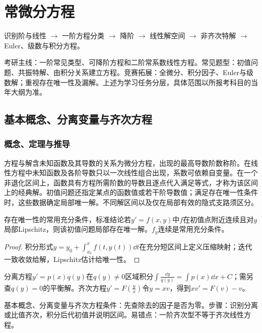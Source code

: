 \chapter{常微分方程}\label{ch:4}
\begin{tcolorbox}[title=章首知识地图,colframe=Ink]
识别阶与线性 $\to$ 一阶方程分类 $\to$ 降阶 $\to$ 线性解空间 $\to$ 非齐次特解 $\to$ Euler、级数与积分方程。
\end{tcolorbox}
\begin{examtip}考研主线：一阶常见类型、可降阶方程和二阶常系数线性方程。常见题型：初值问题、共振特解、由积分关系建立方程。竞赛拓展：全微分、积分因子、Euler与级数解；重视存在唯一性及漏解。上述为学习任务分层，具体范围以所报考科目的当年大纲为准。\end{examtip}
\section{基本概念、分离变量与齐次方程}\label{sec:4:1}
\subsection{概念、定理与推导}

\begin{definition}{方程与解}含未知函数及其导数的关系为微分方程，出现的最高导数阶数称阶。在线性方程中未知函数及各阶导数只以一次线性组合出现，系数可依赖自变量。在一个非退化区间上，函数具有方程所需阶数的导数且逐点代入满足等式，才称为该区间上的经典解。初值问题还指定某点的函数值或若干阶导数值；满足存在唯一性条件时，这些数据确定局部唯一解。不同解区间以及仅在局部有效的隐式支路须区分。\end{definition}
\begin{theorem}{存在唯一性的常用充分条件，标准结论}若$y\prime=f(x,y)$中$f$在初值点附近连续且对$y$局部Lipschitz，则该初值问题局部存在唯一解。$f_y$连续是常用充分条件。\end{theorem}
\begin{proof}积分形式$y=y_0+\int_{x_0}^xf(t,y(t))\dd t$在充分短区间上定义压缩映射；迭代一致收敛给解，Lipschitz估计给唯一性。\end{proof}
分离方程$y\prime=p(x)q(y)$在$q(y)\ne0$区域积分$\int\frac{\dd y}{q(y)}=\int p(x)\dd x+C$；需另查$q(y)=0$的平衡解。齐次方程$y\prime=F(\frac{y}{x})$令$y=xv$，得到$xv\prime=F(v)-v$。

\begin{method}{基本概念、分离变量与齐次方程}条件：先查除去的因子是否为零。步骤：识别分离或比值齐次，积分后代初值并说明区间。易错点：一阶齐次型不等于齐次线性方程。\end{method}
